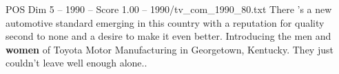 \begin{textsample}{POS Dim 5 – 1990 – Score 1.00 – 1990/tv\_com\_1990\_80.txt}  \label{ex:f5_pos_026}
There 's a new automotive standard emerging in this country with a reputation for quality second to none and a desire to make it even better.
Introducing the men and \textbf{women} of Toyota Motor Manufacturing in Georgetown, Kentucky.
They just couldn't leave well enough alone..

\end{textsample}
